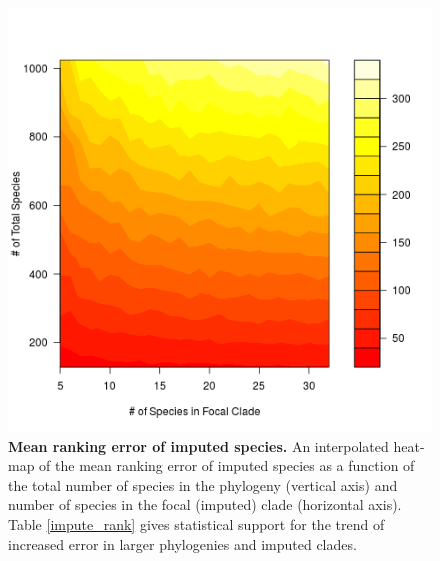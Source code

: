 \documentclass[10pt,english]{article}
\begin{document}
\begin{figure}[!ht]
  \center
  \includegraphics[width=.5\textwidth]{rankingError.png}
  \caption{\textbf{Mean ranking error of imputed species.} An
    interpolated heat-map of the mean ranking error of imputed species
    as a function of the total number of species in the phylogeny
    (vertical axis) and number of species in the focal (imputed) clade
    (horizontal axis). Table \ref{impute_rank} gives statistical
    support for the trend of increased error in larger phylogenies and
    imputed clades.}
  \label{rankingError}
\end{figure}
\end{document}

